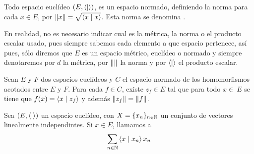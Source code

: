 Todo espacio euclídeo $(E, \left\langle\mid\right\rangle)$, es un espacio normado, definiendo la norma para cada $x\in E$, por $\lVert x\rVert=\sqrt{\left\langle x\mid x\right\rangle}$. Esta norma se denomina .

En realidad, no es necesario indicar cual es la métrica, la norma o el producto escalar usado, pues siempre sabemos cada elemento a que espacio pertenece, así pues, sólo diremos que $E$ es un espacio métrico, euclídeo o normado y siempre denotaremos por $d$ la métrica, por $\lVert\rVert$ la norma y por $\left\langle\mid\right\rangle$ el producto escalar.

\begin{resultado}[Riesz]
  Sean $E$ y $F$ dos espacios euclídeos y $C$ el espacio normado de los homomorfismos acotados entre $E$ y $F$. Para cada $f\in C$, existe $z_f\in E$ tal que para todo $x\in\ E$ se tiene que $f(x)=\left\langle x\mid z_f\right\rangle$ y además $\lVert z_f\rVert=\lVert f\rVert$.
\end{resultado}

\begin{definicion}
  Sea $(E, \left\langle\mid\right\rangle)$ un espacio euclídeo, con $X=\{x_n\}_{n\in\mathbb{N}}$ un conjunto de vectores linealmente independintes. Si $x\in E$, llamamos  a
  \begin{equation}
    \sum_{n\in\mathbb{N}}\left\langle x\mid x_n\right\rangle x_n
  \end{equation}
\end{definicion}

